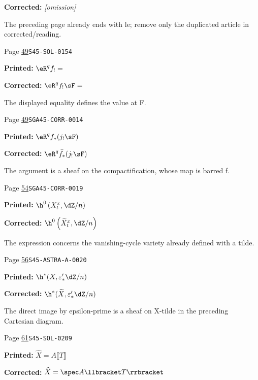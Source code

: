\begin{description}
\par\noindent\textbf{Corrected:} \emph{\textnormal{[omission]}}
\par\noindent The preceding page already ends with le; remove only the duplicated article in corrected/reading.
\smallskip
\item[\hypertarget{apparatus:EN-0017}{17}] Page \hyperlink{printpage:en:49}{49}\quad\texttt{S45-SOL-0154}
\par\noindent\textbf{Printed:} \(\eR^q f_! =\)
\par\noindent\textbf{Corrected:} \(\eR^q f_! \sF =\)
\par\noindent The displayed equality defines the value at F.
\smallskip
\item[\hypertarget{apparatus:EN-0018}{18}] Page \hyperlink{printpage:en:49}{49}\quad\texttt{SGA45-CORR-0014}
\par\noindent\textbf{Printed:} \(\eR^q f_*(j_! \sF)\)
\par\noindent\textbf{Corrected:} \(\eR^q \bar f_*(j_! \sF)\)
\par\noindent The argument is a sheaf on the compactification, whose map is barred f.
\smallskip
\item[\hypertarget{apparatus:EN-0019}{19}] Page \hyperlink{printpage:en:54}{54}\quad\texttt{SGA45-CORR-0019}
\par\noindent\textbf{Printed:} \(\h^0\left(X_t^x,\dZ/n\right)\)
\par\noindent\textbf{Corrected:} \(\h^0\left(\widetilde X_t^x,\dZ/n\right)\)
\par\noindent The expression concerns the vanishing-cycle variety already defined with a tilde.
\smallskip
\item[\hypertarget{apparatus:EN-0020}{20}] Page \hyperlink{printpage:en:56}{56}\quad\texttt{S45-ASTRA-A-0020}
\par\noindent\textbf{Printed:} \(\h^*(X,\varepsilon_*' \dZ/n)\)
\par\noindent\textbf{Corrected:} \(\h^*(\widetilde X,\varepsilon_*' \dZ/n)\)
\par\noindent The direct image by epsilon-prime is a sheaf on X-tilde in the preceding Cartesian diagram.
\smallskip
\item[\hypertarget{apparatus:EN-0021}{21}] Page \hyperlink{printpage:en:61}{61}\quad\texttt{S45-SOL-0209}
\par\noindent\textbf{Printed:} \(\widehat X=A\llbracket T\rrbracket\)
\par\noindent\textbf{Corrected:} \(\widehat X=\spec A\llbracket T\rrbracket\)

\end{description}
